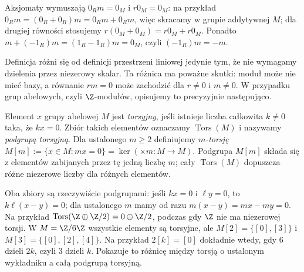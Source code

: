 Aksjomaty wymuszają $0_Rm=0_M$ i $r0_M=0_M$:
na przykład $0_Rm=(0_R+0_R)m=0_Rm+0_Rm$,
więc skracamy w grupie addytywnej $M$; dla drugiej
równości stosujemy $r(0_M+0_M)=r0_M+r0_M$.
Ponadto $m+(-1_R)m=(1_R-1_R)m=0_M$,
czyli $(-1_R)m=-m$.

Definicja różni się od definicji przestrzeni liniowej
jedynie tym, że nie wymagamy dzielenia przez
niezerowy skalar. Ta różnica ma poważne skutki:
moduł może nie mieć bazy, a równanie $rm=0$ może
zachodzić dla $r\ne0$ i $m\ne0$.
W przypadku grup abelowych, czyli $\Z$-modułów,
opisujemy to precyzyjnie następująco.

\begin{definicja}
\label{def:torsja}
Element $x$ grupy abelowej $M$ jest
\emph{torsyjny}, jeśli istnieje liczba całkowita
$k\ne0$ taka, że $kx=0$. Zbiór takich elementów
oznaczamy $\operatorname{Tors}(M)$ i nazywamy
\emph{podgrupą torsyjną}. Dla ustalonego $m\geq2$
definiujemy \emph{$m$-torsję}
$M[m]:=\{x\in M:mx=0\}=\ker(\times m:M\to M)$.
Podgrupa $M[m]$ składa się z elementów zabijanych
przez tę jedną liczbę $m$; cały
$\operatorname{Tors}(M)$ dopuszcza różne niezerowe
liczby dla różnych elementów.
\end{definicja}

Oba zbiory są rzeczywiście podgrupami: jeśli
$kx=0$ i $\ell y=0$, to $k\ell(x-y)=0$;
dla ustalonego $m$ mamy od razu
$m(x-y)=mx-my=0$. Na przykład
$\operatorname{Tors}(\Z\oplus\Z/2)
=0\oplus\Z/2$, podczas gdy $\Z$
nie ma niezerowej torsji.
W $M=\Z/6\Z$ wszystkie elementy są torsyjne,
ale $M[2]=\{[0],[3]\}$ i
$M[3]=\{[0],[2],[4]\}$. Na przykład
$2[k]=[0]$ dokładnie wtedy, gdy $6$ dzieli $2k$,
czyli $3$ dzieli $k$. Pokazuje to różnicę między
torsją o ustalonym wykładniku a całą podgrupą torsyjną.

